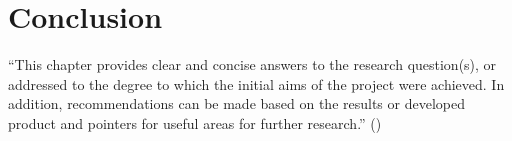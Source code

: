 \chapter{Conclusion}
\label{ch:conclusion}

\enquote{This chapter provides clear and concise answers to the research question(s), or addressed to the
degree to which the initial aims of the project were achieved. In addition, recommendations can
be made based on the results or developed product and pointers for useful areas for further
research.} (\cite{handbook})
